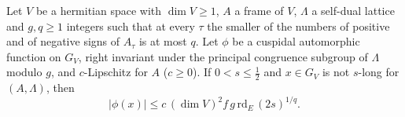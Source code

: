 \begin{lemma}\label{pf:fs:shortLine}
Let $V$ be a hermitian space with $\dim V\ge1$, $A$ a frame of $V$, $\Lambda$ a self-dual lattice and $g,q\ge1$ integers such that at every $\tau$
the smaller of the numbers of positive and of negative signs of $A_\tau$ is at most $q$. Let $\phi$ be a cuspidal automorphic function on $G_V$,
right invariant under the principal congruence subgroup of $\Lambda$ modulo $g$, and $c$-Lipschitz for $A$ ($c\ge0$). If $0<s\le\frac12$ and
$x\in G_V$ is not $s$-long for $(A,\Lambda)$, then
\[
|\phi(x)|\le c\,(\dim V)^2f\,g\,\mathrm{rd}_E\,(2s)^{1/q}.
\]
\end{lemma}

